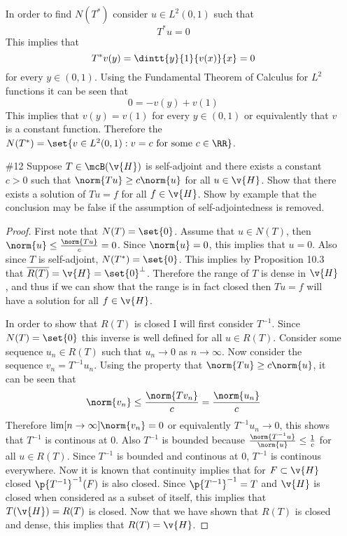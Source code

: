 \documentclass[11pt, oneside]{article}
\begin{document}
\begin{enumerate}
    In order to find $N(T^*)$ consider $u \in L^2(0, 1)$ such that
    \[
      T^* u = 0
    \]
    This implies that
    \[
      T^* v(y) = \dintt{y}{1}{v(x)}{x} = 0
    \]
    for every $y \in (0, 1)$.
    Using the Fundamental Theorem of Calculus for $L^2$ functions it can be seen
    that
    \[
      0 = -v(y) + v(1)
    \]
    This implies that $v(y) = v(1)$ for every $y \in (0, 1)$ or equivalently
    that $v$ is a constant function.
    Therefore the
    $N(T^*) = \set{v \in L^2(0, 1): v = c \text{ for some } c \in \RR}$.

  \pagebreak
  \item[\#12] %
    Suppose $T \in \mcB(\v{H})$ is self-adjoint and there exists a constant
    $c > 0$ such that $\norm{Tu} \ge c \norm{u}$ for all $u \in \v{H}$.
    Show that there exists a solution of $Tu = f$ for all $f \in \v{H}$.
    Show by example that the conclusion may be false if the assumption of
    self-adjointedness is removed.

    \begin{proof}
      First note that $N(T) = \set{0}$.
      Assume that $u \in N(T)$, then $\norm{u} \le \frac{\norm{Tu}}{c} = 0$.
      Since $\norm{u} = 0$, this implies that $u = 0$.
      Also since $T$ is self-adjoint, $N(T^*) = \set{0}$.
      This implies by Proposition 10.3 that
      $\overline{R(T)} = \v{H} = \set{0}^{\perp}$.
      Therefore the range of $T$ is dense in $\v{H}$, and thus if we can show
      that the range is in fact closed then $Tu = f$ will have a solution for
      all $f \in \v{H}$.

      In order to show that $R(T)$ is closed I will first consider $T^{-1}$.
      Since $N(T) = \set{0}$ this inverse is well defined for all $u \in R(T)$.
      Consider some sequence $u_n \in R(T)$ such that $u_n \to 0$ as
      $n \to \infty$.
      Now consider the sequence $v_n = T^{-1}u_n$.
      Using the property that $\norm{Tu} \ge c \norm{u}$, it can be seen that
      \[
        \norm{v_n} \le \frac{\norm{Tv_n}}{c} = \frac{\norm{u_n}}{c}
      \]
      Therefore $\lim[n \to \infty]{\norm{v_n}} = 0$ or equivalently
      $T^{-1}u_n \to 0$, this shows that $T^{-1}$ is continous at $0$.
      Also $T^{-1}$ is bounded because $\frac{\norm{T^{-1}u}}{\norm{u}} \le \frac{1}{c}$
      for all $u \in R(T)$.
      Since $T^{-1}$ is bounded and continous at 0, $T^{-1}$ is continous
      everywhere.
      Now it is known that continuity implies that for $F \subset \v{H}$ closed
      $\p{T^{-1}}^{-1}(F)$ is also closed.
      Since $\p{T^{-1}}^{-1} = T$ and $\v{H}$ is closed when considered as a
      subset of itself, this implies that $T(\v{H}) = R(T)$ is closed.
      Now that we have shown that $R(T)$ is closed and dense, this implies
      that $R(T) = \v{H}$.


\end{proof}
\end{enumerate}
\end{document}
